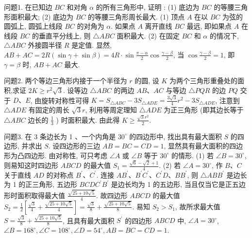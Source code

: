
问题1. 在已知边 $B C$ 和对角 $\alpha$ 的所有三角形中, 证明 :
(1) 底边为 $B C$ 的等腰三角形面积最大;
(2) 底边为 $B C$ 的等腰三角形周长最大.
(1) 顶点 $A$ 在以 $B C$ 为弦的圆弧上, 圆弧上线段 $B C$ 的对角为 $\alpha$. 如果点 $A$ 离开直线 $B C$ 最远, 即如果点 $A$ 在线段 $B C$ 的垂直平分线上, 则 $\triangle A B C$ 面积最大.
(2) 在固定 $B C$ 和 $\alpha$ 的情况下, $\triangle A B C$ 外接圆半径 $R$ 是定值.
显然, $A B+A C=2 R(\sin \gamma+\sin \beta)=4 R \cdot \sin \frac{\pi-\alpha}{2} \cos \frac{\gamma-\beta}{2}$, 当 $\cos \frac{\gamma-\beta}{2}=1$, 即 $\gamma=\beta$ 时, $A B+A C$ 最大.



问题2. 两个等边三角形内接于一个半径为 $r$ 的圆, 设 $K$ 为两个三角形重叠处的面积,求证 $2 K \geqslant r^2 \sqrt{3}$.
设等边 $\triangle A B C$ 的两边 $A B 、 A C$ 与等边 $\triangle P Q R$ 的边 $P Q$ 交于 $D 、 E$, 由旋转对称性可得 $K=S_{\triangle A B C}-3 S_{\triangle A D E}=\frac{3 \sqrt{3}}{4} r^2-3 S_{\triangle A D E}$, 注意到 $\triangle A D E$ 有固定的周长 $\sqrt{3} r$, 利用等周定理知 $\triangle A D E$ 为正三角形 (即其边长等于 $\triangle A B C$ 边长的 $\frac{1}{3}$ ) 时面积最大.
由此得 $K \geqslant \frac{\sqrt{3} r^2}{2}$.



问题3. 在 3 条边长为 1 、一个内角是 $30^{\circ}$ 的四边形中, 找出具有最大面积 $S$ 的四边形, 并求出 $S$.
设四边形的三边 $A B=B C=C D=1$, 显然具有最大面积的四边形为凸四边形.
由对称性, 可只考虑 $\angle A$ 或 $\angle B$ 等于 $30^{\circ}$ 的情形.
(1) 若 $\angle B=30^{\circ}$, 则易知这时四边形 $A B C D$ 的最大值 $S_1=\frac{\sqrt{6}-\sqrt{2}+1}{4}$. (2) 若 $\angle A=30^{\circ}$, 作 $B 、 C$ 关于直线 $A D$ 的对称点 $B^{\prime} 、 C^{\prime}$. 连接 $A B^{\prime} 、 B^{\prime} C^{\prime} 、 C^{\prime} D 、 B B^{\prime}$, 则 $\triangle A B B^{\prime}$ 是边长为 1 的正三角形, 五边形 $B C D C^{\prime} B^{\prime}$ 是边长均为 1 的五边形, 当且仅当它是正五边形时面积取得最大值 $\frac{\sqrt{25+10 \sqrt{5}}}{4}$. 故四边形 $A B C D$ 的最大值 $S_2=\frac{1}{2}\left[\frac{\sqrt{3}}{4}+\frac{\sqrt{25+10 \sqrt{5}}}{4}\right]=\frac{\sqrt{3}}{8}+\frac{\sqrt{25+10 \sqrt{5}}}{8}$. 易知 $S_2>S_1$, 故所求最大值 $S=\frac{\sqrt{3}}{8}+\frac{\sqrt{25+10 \sqrt{5}}}{8}$, 且具有最大面积 $S^{\prime}$ 的四边形 $A B C D$ 中, $\angle A=30^{\circ}$, $\angle B=168^{\circ}, \angle C=108^{\circ}, \angle D=54^{\circ}, A B=B C=C D=1$.



